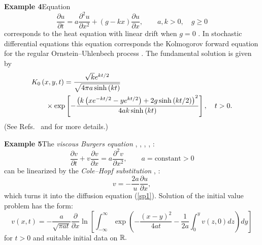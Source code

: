 \documentclass[12pt,reqno]{amsart}
\theoremstyle{plain}
\numberwithin{equation}{section}
\begin{document}
\bigskip

\textbf{Example 4\quad }Equation\begin{equation}
\frac{\partial u}{\partial t}=a\frac{\partial ^{2}u}{\partial x^{2}}+\left(
g-kx\right) \frac{\partial u}{\partial x},\qquad a,k>0,\quad g\geq 0
\label{sp7}
\end{equation}corresponds to the heat equation with linear drift when $g=0$ \cite{Miller77}. In stochastic differential equations this equation corresponds the
Kolmogorov forward equation for the regular Ornstein--Uhlenbech process \cite{Craddock09}. The fundamental solution is given by\begin{align}
& K_{0}\left( x,y,t\right) =\frac{\sqrt{k}e^{kt/2}}{\sqrt{4\pi a\sinh \left(
kt\right) }}  \label{sp8} \\
& \qquad \times \exp \left[ -\frac{\left( k\left(
xe^{-kt/2}-ye^{kt/2}\right) +2g\sinh \left( kt/2\right) \right) ^{2}}{4ak\sinh \left( kt\right) }\right] ,\quad t>0.  \notag
\end{align}(See Refs.~\cite{Craddock09} and \cite{SuazoSusVega10} for more details.)

\bigskip

\textbf{Example 5\quad }The \textit{viscous Burgers equation }\cite{Bateman15}, \cite{Burgers48}, \cite{Kadom:Karp71}, \cite{Kudryash:Sine09}, 
\cite{Whitham}:\begin{equation}
\frac{\partial v}{\partial t}+v\frac{\partial v}{\partial x}=a\frac{\partial
^{2}v}{\partial x^{2}},\qquad a=\text{constant}>0  \label{vBurgers}
\end{equation}can be linearized by the \textit{Cole--Hopf substitution} \cite{Cole50}, 
\cite{Hopf50}:\begin{equation}
v=-\frac{2a}{u}\frac{\partial u}{\partial x},  \label{vColeHopf}
\end{equation}which turns it into the diffusion equation (\ref{sp1}). Solution of the
initial value problem has the form:\begin{equation}
v\left( x,t\right) =-\frac{a}{\sqrt{\pi at}}\frac{\partial }{\partial x}\ln \left[ \int_{-\infty }^{\infty }\exp \left( -\frac{\left( x-y\right) ^{2}}{4at}-\frac{1}{2a}\int_{0}^{y}v\left( z,0\right) dz\right) dy\right]
\label{vBurgersSolution}
\end{equation}for $t>0$ and suitable initial data on $\mathbb{R}
.\medskip $

\bigskip
\end{document}
